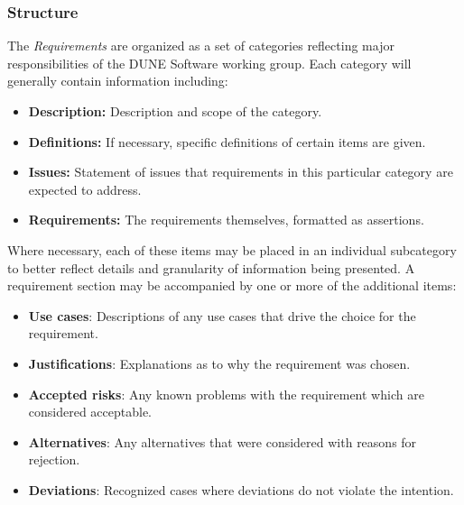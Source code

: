 
\subsubsection{Structure}

The \textit{Requirements} are organized as a set of categories reflecting major responsibilities of the DUNE Software working group.  Each category will generally
contain information including:

\begin{itemize}
\item \textbf{Description:} Description and scope of the category.
\item \textbf{Definitions:} If necessary, specific definitions of certain items are given.
\item \textbf{Issues:} Statement of issues that requirements in this particular category are expected to address.
\item \textbf{Requirements:} The requirements themselves, formatted as assertions.
\end{itemize}

Where necessary, each of these items may be placed in an individual subcategory to better reflect details and granularity of information being presented. A requirement section may be accompanied by one or more of the additional items:

\begin{itemize}
\item \textbf{Use cases}: Descriptions of any use cases that drive the choice for the requirement.
\item \textbf{Justifications}: Explanations as to why the requirement was chosen.
\item \textbf{Accepted risks}: Any known problems with the requirement which are considered acceptable.
\item \textbf{Alternatives}: Any alternatives that were considered with reasons for rejection.
\item \textbf{Deviations}: Recognized cases where deviations do not violate the intention.
\end{itemize}


